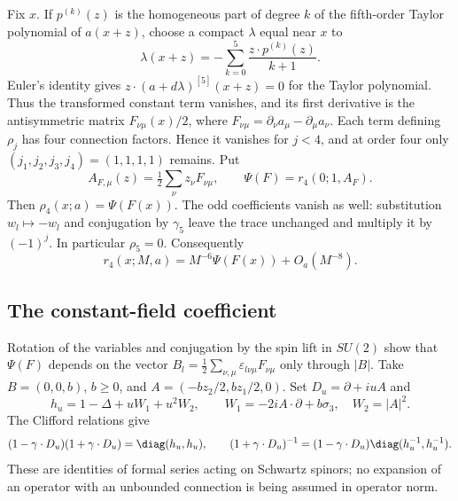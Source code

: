 \documentclass[11pt,letterpaper,reqno]{amsart}
\begin{document}
Fix $x$. If $p^{(k)}(z)$ is the homogeneous part of degree $k$ of
the fifth-order Taylor polynomial of $a(x+z)$, choose a compact
$\lambda$ equal near $x$ to
\[
 \lambda(x+z)=-\sum_{k=0}^5\frac{z\cdot p^{(k)}(z)}{k+1}.
\]
Euler's identity gives $z\cdot(a+d\lambda)^{[5]}(x+z)=0$ for
the Taylor polynomial. Thus the transformed constant term vanishes,
and its first derivative is the antisymmetric matrix
$F_{\nu\mu}(x)/2$, where
$F_{\nu\mu}=\partial_\nu a_\mu-\partial_\mu a_\nu$.
Each term defining $\rho_j$ has four connection factors. Hence it
vanishes for $j<4$, and at order four only $(j_1,j_2,j_3,j_4)=(1,1,1,1)$
remains. Put
\[
 A_{F,\mu}(z)=\tfrac12\sum_\nu z_\nu F_{\nu\mu},\qquad
 \Psi(F)=r_4(0;1,A_F).
\]
Then $\rho_4(x;a)=\Psi(F(x))$. The odd coefficients vanish as well:
substitution $w_l\mapsto-w_l$ and conjugation by $\gamma_5$ leave
the trace unchanged and multiply it by $(-1)^j$. In particular
$\rho_5=0$. Consequently
\begin{equation}\label{eq:probe-field-strength-reduction}
 r_4(x;M,a)=M^{-6}\Psi(F(x))+O_a(M^{-8}).
\end{equation}

\subsection{The constant-field coefficient}

Rotation of the variables and conjugation by the spin lift in $SU(2)$
show that $\Psi(F)$ depends on the vector
$B_l=\tfrac12\sum_{\nu,\mu}\varepsilon_{l\nu\mu}F_{\nu\mu}$ only
through $|B|$. Take $B=(0,0,b)$, $b\ge0$, and
$A=(-bz_2/2,bz_1/2,0)$. Set $D_u=\partial+iuA$ and
\[
 h_u=1-\Delta+uW_1+u^2W_2,\qquad
 W_1=-2iA\cdot\partial+b\sigma_3,\quad
 W_2=|A|^2.
\]
The Clifford relations give
\begin{equation}\label{eq:probe-squared-dirac}
 (1-\gamma\cdot D_u)(1+\gamma\cdot D_u)
   =\diag(h_u,h_u),\qquad
 (1+\gamma\cdot D_u)^{-1}
   =(1-\gamma\cdot D_u)\diag(h_u^{-1},h_u^{-1}).
\end{equation}
These are identities of formal series acting on Schwartz spinors;
no expansion of an operator with an unbounded connection is being
assumed in operator norm.
\end{document}
